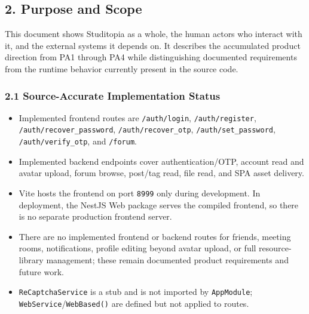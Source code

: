 \documentclass[12pt]{article}
\begin{document}
\hypertarget{sec:2-purpose-and-scope}{}
\subsection*{2. Purpose and Scope}
\par\medskip

This document shows Studitopia as a whole, the human actors who interact with it, and the external systems it depends on. It describes the accumulated product direction from PA1 through PA4 while distinguishing documented requirements from the runtime behavior currently present in the source code.
\par\medskip

\hypertarget{sec:2-1-source-accurate-implementation-status}{}
\subsubsection*{2.1 Source-Accurate Implementation Status}
\par\medskip

\begin{itemize}
\item Implemented frontend routes are \texttt{/auth/login}, \texttt{/auth/register}, \texttt{/auth/recover\_password}, \texttt{/auth/recover\_otp}, \texttt{/auth/set\_password}, \texttt{/auth/verify\_otp}, and \texttt{/forum}.
\item Implemented backend endpoints cover authentication/OTP, account read and avatar upload, forum browse, post/tag read, file read, and SPA asset delivery.
\item Vite hosts the frontend on port \texttt{8999} only during development. In deployment, the NestJS Web package serves the compiled frontend, so there is no separate production frontend server.
\item There are no implemented frontend or backend routes for friends, meeting rooms, notifications, profile editing beyond avatar upload, or full resource-library management; these remain documented product requirements and future work.
\item \texttt{ReCaptchaService} is a stub and is not imported by \texttt{AppModule}; \texttt{WebService}/\texttt{WebBased()} are defined but not applied to routes.
\end{itemize}
\par\medskip
\end{document}
